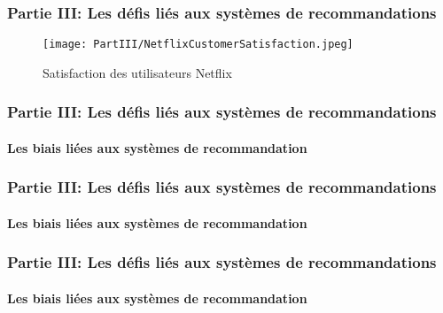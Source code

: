 \begin{frame}

    \frametitle{Partie III: Les défis liés aux systèmes de recommandations}

    \begin{figure}
        \centering
        \texttt{[image: PartIII/NetflixCustomerSatisfaction.jpeg]}
        \caption{Satisfaction des utilisateurs Netflix}
    \end{figure}

\end{frame}

\begin{frame}

    \frametitle{Partie III: Les défis liés aux systèmes de recommandations}
    \framesubtitle{Les biais liées aux systèmes de recommandation}

    \begin{figure}
        \centering
    \end{figure}

\end{frame}

\begin{frame}

    \frametitle{Partie III: Les défis liés aux systèmes de recommandations}
    \framesubtitle{Les biais liées aux systèmes de recommandation}

    \begin{figure}
        \centering
    \end{figure}

\end{frame}

\begin{frame}

    \frametitle{Partie III: Les défis liés aux systèmes de recommandations}
    \framesubtitle{Les biais liées aux systèmes de recommandation}

    \begin{figure}
        \centering
    \end{figure}

\end{frame}

